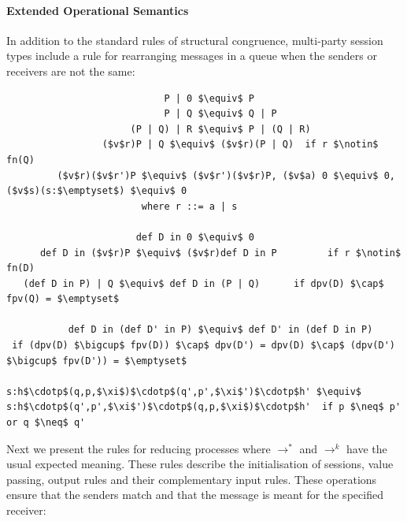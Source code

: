 \documentclass[11pt]{scrartcl}
\begin{document}
\paragraph{Extended Operational Semantics}
In addition to the standard rules of structural congruence, multi-party session
types include a rule for rearranging messages in a queue when the senders or
receivers are not the same:
\\

\begin{lstlisting}
                            P | 0 $\equiv$ P
                            P | Q $\equiv$ Q | P
                      (P | Q) | R $\equiv$ P | (Q | R)
                 ($v$r)P | Q $\equiv$ ($v$r)(P | Q)  if r $\notin$ fn(Q)
         ($v$r)($v$r')P $\equiv$ ($v$r')($v$r)P, ($v$a) 0 $\equiv$ 0, ($v$s)(s:$\emptyset$) $\equiv$ 0
                        where r ::= a | s

                       def D in 0 $\equiv$ 0
      def D in ($v$r)P $\equiv$ ($v$r)def D in P         if r $\notin$ fn(D)
   (def D in P) | Q $\equiv$ def D in (P | Q)      if dpv(D) $\cap$ fpv(Q) = $\emptyset$

           def D in (def D' in P) $\equiv$ def D' in (def D in P)
 if (dpv(D) $\bigcup$ fpv(D)) $\cap$ dpv(D') = dpv(D) $\cap$ (dpv(D') $\bigcup$ fpv(D')) = $\emptyset$

s:h$\cdotp$(q,p,$\xi$)$\cdotp$(q',p',$\xi$')$\cdotp$h' $\equiv$ s:h$\cdotp$(q',p',$\xi$')$\cdotp$(q,p,$\xi$)$\cdotp$h'  if p $\neq$ p' or q $\neq$ q'
\end{lstlisting}

Next we present the rules for reducing processes where $\rightarrow^*$ and 
$\rightarrow^k$ have the usual expected meaning. These rules describe the
initialisation of sessions, value passing, output rules and their complementary
input rules. These operations ensure that the senders match and that the message
is meant for the specified receiver:
\\
\end{document}
